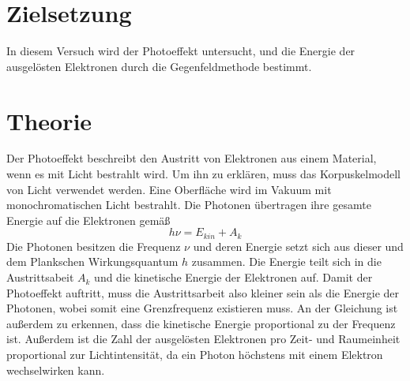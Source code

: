 \section{Zielsetzung}
\label{sec:Zielsetzung}
In diesem Versuch wird der Photoeffekt untersucht, und die Energie der ausgelösten Elektronen durch die Gegenfeldmethode bestimmt.
\section{Theorie}
\label{sec:Theorie}

Der Photoeffekt beschreibt den Austritt von Elektronen aus einem Material, wenn es mit Licht bestrahlt wird. 
Um ihn zu erklären, muss das Korpuskelmodell von Licht verwendet werden. Eine Oberfläche wird im Vakuum mit monochromatischen Licht bestrahlt. Die Photonen übertragen ihre gesamte Energie auf die Elektronen gemäß
\begin{equation}
h \nu = E_{kin} + A_k
\end{equation}
Die Photonen besitzen die Frequenz $\nu$ und deren Energie setzt sich aus dieser und dem Plankschen Wirkungsquantum $h$ zusammen. Die Energie teilt sich in die Austrittsabeit $A_k$ und die kinetische Energie der Elektronen auf. 
Damit der Photoeffekt auftritt, muss die Austrittsarbeit also kleiner sein als die Energie der Photonen, wobei somit eine Grenzfrequenz existieren muss. 
An der Gleichung ist außerdem zu erkennen, dass die kinetische Energie proportional zu der Frequenz ist.
Außerdem ist die Zahl der ausgelösten Elektronen pro Zeit- und Raumeinheit proportional zur Lichtintensität, da ein Photon höchstens mit einem Elektron wechselwirken kann.

